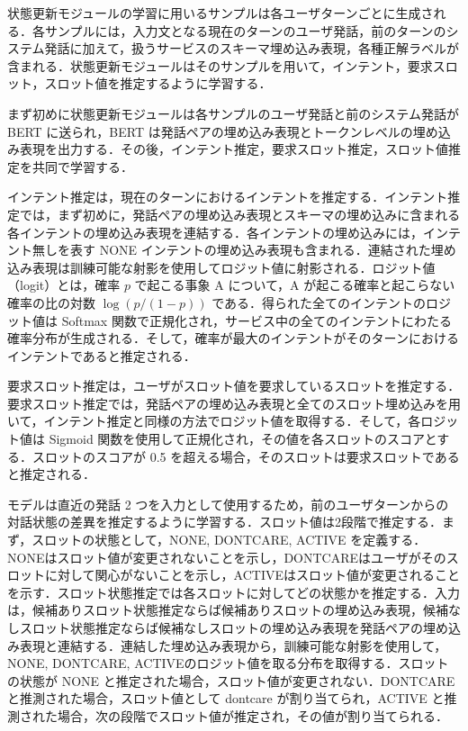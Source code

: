状態更新モジュールの学習に用いるサンプルは各ユーザターンごとに生成される．各サンプルには，入力文となる現在のターンのユーザ発話，前のターンのシステム発話に加えて，扱うサービスのスキーマ埋め込み表現，各種正解ラベルが含まれる．状態更新モジュールはそのサンプルを用いて，インテント，要求スロット，スロット値を推定するように学習する．
\par
まず初めに状態更新モジュールは各サンプルのユーザ発話と前のシステム発話が BERT に送られ，BERT は発話ペアの埋め込み表現とトークンレベルの埋め込み表現を出力する．その後，インテント推定，要求スロット推定，スロット値推定を共同で学習する．
\par
インテント推定は，現在のターンにおけるインテントを推定する．インテント推定では，まず初めに，発話ペアの埋め込み表現とスキーマの埋め込みに含まれる各インテントの埋め込み表現を連結する．各インテントの埋め込みには，インテント無しを表す NONE インテントの埋め込み表現も含まれる．連結された埋め込み表現は訓練可能な射影を使用してロジット値に射影される．ロジット値（logit）とは，確率 $p$ で起こる事象 A について，A が起こる確率と起こらない確率の比の対数 $\log(p / (1-p))$ である．得られた全てのインテントのロジット値は Softmax 関数で正規化され，サービス中の全てのインテントにわたる確率分布が生成される．そして，確率が最大のインテントがそのターンにおけるインテントであると推定される．
\par
要求スロット推定は，ユーザがスロット値を要求しているスロットを推定する．要求スロット推定では，発話ペアの埋め込み表現と全てのスロット埋め込みを用いて，インテント推定と同様の方法でロジット値を取得する．そして，各ロジット値は Sigmoid 関数を使用して正規化され，その値を各スロットのスコアとする．スロットのスコアが 0.5 を超える場合，そのスロットは要求スロットであると推定される．
\par
モデルは直近の発話 2 つを入力として使用するため，前のユーザターンからの対話状態の差異を推定するように学習する．スロット値は2段階で推定する．まず，スロットの状態として，NONE, DONTCARE, ACTIVE を定義する．NONEはスロット値が変更されないことを示し，DONTCAREはユーザがそのスロットに対して関心がないことを示し，ACTIVEはスロット値が変更されることを示す．スロット状態推定では各スロットに対してどの状態かを推定する．入力は，候補ありスロット状態推定ならば候補ありスロットの埋め込み表現，候補なしスロット状態推定ならば候補なしスロットの埋め込み表現を発話ペアの埋め込み表現と連結する．連結した埋め込み表現から，訓練可能な射影を使用して，NONE, DONTCARE, ACTIVEのロジット値を取る分布を取得する．スロットの状態が NONE と推定された場合，スロット値が変更されない．DONTCAREと推測された場合，スロット値として dontcare が割り当てられ，ACTIVE と推測された場合，次の段階でスロット値が推定され，その値が割り当てられる．
